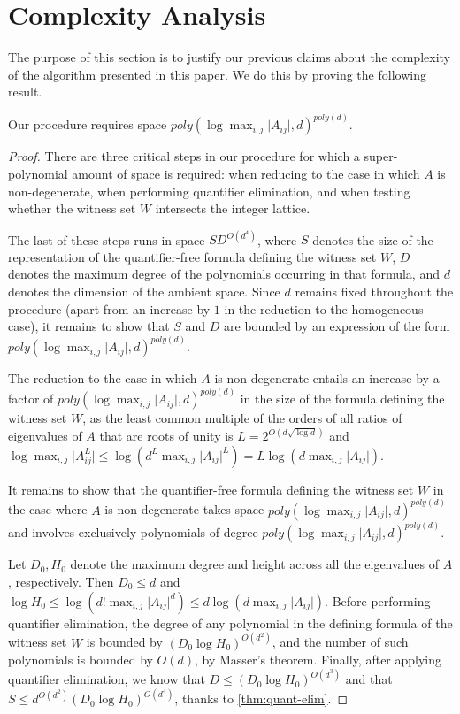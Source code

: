 \section{Complexity Analysis}
\label{sec:complexity}

The purpose of this section is to justify our previous claims about
the complexity of the algorithm presented in this paper. We do this by
proving the following result.

\begin{proposition}
Our procedure requires space $\mathit{poly}(\log\max_{i,j}\lvert A_{ij}\rvert,d)^{\mathit{poly}(d)}$.
\end{proposition}

\begin{proof}
There are three critical steps in our procedure for which a
super-polynomial amount of space is required: when reducing to the
case in which $A$ is non-degenerate, when performing quantifier
elimination, and when testing whether the witness set $W$ intersects
the integer lattice.

The last of these steps runs in space $SD^{O(d^4)}$, where $S$ denotes
the size of the representation of the quantifier-free formula defining
the witness set $W$, $D$ denotes the maximum degree of the polynomials
occurring in that formula, and $d$ denotes the dimension of the
ambient space. Since $d$ remains fixed throughout the procedure (apart
from an increase by $1$ in the reduction to the homogeneous case), it
remains to show that $S$ and $D$ are bounded by an expression of the
form $\mathit{poly}(\log\max_{i,j}\lvert
A_{ij}\rvert,d)^{\mathit{poly}(d)}$.

The reduction to the case in which $A$ is non-degenerate entails an
increase by a factor of $\mathit{poly}(\log\max_{i,j}\lvert
A_{ij}\rvert,d)^{\mathit{poly}(d)}$ in the size of the formula
defining the witness set $W$, as the least common multiple of the
orders of all ratios of eigenvalues of $A$ that are roots of unity is
$L=2^{O(d\sqrt{\log d})}$ and $\log\max_{i,j}\lvert A^L_{ij}\rvert\leq
\log (d^L\max_{i,j}\lvert A_{ij}\rvert^L)=L\log (d\max_{i,j}\lvert
A_{ij}\rvert)$.

It remains to show that the quantifier-free formula defining the witness set $W$ in the case where $A$ is non-degenerate takes space $\mathit{poly}(\log\max_{i,j}\lvert A_{ij}\rvert,d)^{\mathit{poly}(d)}$ and involves exclusively polynomials of degree $\mathit{poly}(\log\max_{i,j}\lvert A_{ij}\rvert,d)^{\mathit{poly}(d)}$.

Let $D_0,H_0$ denote the maximum degree and height across all the eigenvalues of $A$, respectively. Then $D_0\leq d$ and $\log H_0\leq\log (d!\max_{i,j}\lvert A_{ij}\rvert^{d})\leq d\log (d\max_{i,j}\lvert A_{ij}\rvert)$. Before performing quantifier elimination, the degree of any polynomial in the defining formula of the witness set $W$ is bounded by $(D_0\log H_0)^{O(d^2)}$, and the number of such polynomials is bounded by $O(d)$, by Masser's theorem. Finally, after applying quantifier elimination, we know that $D\leq(D_0\log H_0)^{O(d^3)}$ and that $S\leq d^{O(d^2)}(D_0\log H_0)^{O(d^4)}$, thanks to \cref{thm:quant-elim}.
\end{proof}
